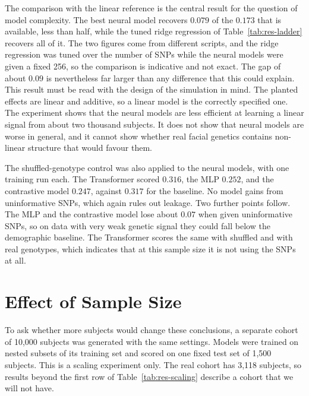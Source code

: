 The comparison with the linear reference is the central result for the question of model complexity. The best neural model recovers $0.079$ of the $0.173$ that is available, less than half, while the tuned ridge regression of Table~\ref{tab:res-ladder} recovers all of it. The two figures come from different scripts, and the ridge regression was tuned over the number of SNPs while the neural models were given a fixed 256, so the comparison is indicative and not exact. The gap of about $0.09$ is nevertheless far larger than any difference that this could explain. This result must be read with the design of the simulation in mind. The planted effects are linear and additive, so a linear model is the correctly specified one. The experiment shows that the neural models are less efficient at learning a linear signal from about two thousand subjects. It does not show that neural models are worse in general, and it cannot show whether real facial genetics contains non-linear structure that would favour them.

The shuffled-genotype control was also applied to the neural models, with one training run each. The Transformer scored $0.316$, the MLP $0.252$, and the contrastive model $0.247$, against $0.317$ for the baseline. No model gains from uninformative SNPs, which again rules out leakage. Two further points follow. The MLP and the contrastive model lose about $0.07$ when given uninformative SNPs, so on data with very weak genetic signal they could fall below the demographic baseline. The Transformer scores the same with shuffled and with real genotypes, which indicates that at this sample size it is not using the SNPs at all.

\section{Effect of Sample Size}
To ask whether more subjects would change these conclusions, a separate cohort of 10{,}000 subjects was generated with the same settings. Models were trained on nested subsets of its training set and scored on one fixed test set of 1{,}500 subjects. This is a scaling experiment only. The real cohort has 3{,}118 subjects, so results beyond the first row of Table~\ref{tab:res-scaling} describe a cohort that we will not have.


